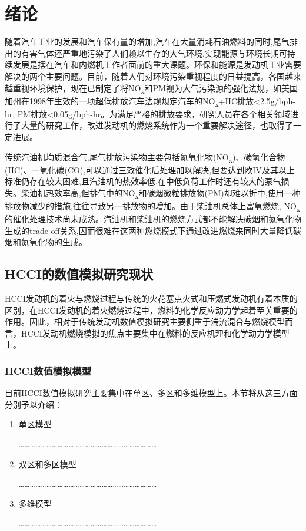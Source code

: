 \chapter{绪论}

随着汽车工业的发展和汽车保有量的增加,汽车在大量消耗石油燃料的同时,尾气排出的有害气体还严重地污染了人们赖以生存的大气环境,实现能源与环境长期可持续发展是摆在汽车和内燃机工作者面前的重大课题。环保和能源是发动机工业需要解决的两个主要问题。目前，随着人们对环境污染重视程度的日益提高，各国越来越重视环境保护，现在已制定了将NO\textsubscript{x}和PM视为大气污染源的强化法规，如美国加州在1998年生效的一项超低排放汽车法规规定汽车的NO\textsubscript{x}+HC排放<2.5g/bph-hr, PM排放<0.05g/bph-hr。为满足严格的排放要求，研究人员在各个相关领域进行了大量的研究工作，改进发动机的燃烧系统作为一个重要解决途径，也取得了一定进展\cite{jiang1998}。

传统汽油机均质混合气,尾气排放污染物主要包括氮氧化物(NO\textsubscript{x})、碳氢化合物(HC)、一氧化碳(CO),可以通过三效催化后处理加以解决,但要达到欧IV及其以上标准仍存在较大困难,且汽油机的热效率低,在中低负荷工作时还有较大的泵气损失。柴油机热效率高,但排气中的NO\textsubscript{x}和碳烟微粒排放物(PM)却难以折中,使用一种排放物减少的措施,往往导致另一排放物的增加。由于柴油机总体上富氧燃烧, NO\textsubscript{x}的催化处理技术尚未成熟。汽油机和柴油机的燃烧方式都不能解决碳烟和氮氧化物生成的trade-off关系,因而很难在这两种燃烧模式下通过改进燃烧来同时大量降低碳烟和氮氧化物的生成。

\section{HCCI的数值模拟研究现状}

HCCI发动机的着火与燃烧过程与传统的火花塞点火式和压燃式发动机有着本质的区别，在HCCI发动机的着火燃烧过程中，燃料的化学反应动力学起着至关重要的作用。因此，相对于传统发动机数值模拟研究主要侧重于湍流混合与燃烧模型而言，HCCI发动机燃烧模拟的焦点主要集中在燃料的反应机理和化学动力学模型上。

\subsection{HCCI数值模拟模型}

目前HCCI数值模拟研究主要集中在单区、多区和多维模型上\cite{cmes1990}。本节将从这三方面分别予以介绍：
\begin{enumerate}
  \item 单区模型

…………………………………………………………………
  \item 双区和多区模型

…………………………………………………………………
  \item 多维模型

…………………………………………………………………
\end{enumerate}
